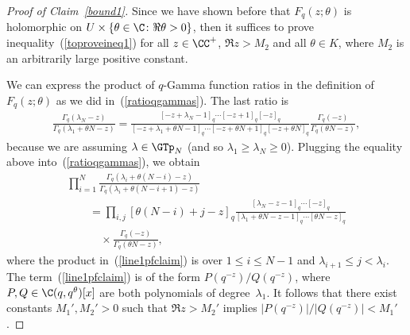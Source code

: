 \begin{proof}[Proof of Claim~\ref{bound1}]
Since we have shown before that $F_q(z; \theta)$ is holomorphic on $U\times\{\theta\in\C\colon \Re\theta > 0\}$, then it suf\/f\/ices to prove inequality~(\ref{toproveineq1}) for all $z\in\CC^+$, $\Re z > M_2$ and all $\theta\in K$, where $M_2$ is an arbitrarily large positive constant.

We can express the product of $q$-Gamma function ratios in the def\/inition of $F_q(z; \theta)$ as we did in~(\ref{ratioqgammas}). The last ratio is
\begin{gather*}
\frac{\Gamma_q(\lambda_N - z)}{\Gamma_q(\lambda_1 + \theta N - z)} = \frac{[-z + \lambda_N - 1]_q\cdots [-z+1]_q[-z]_q}{[-z + \lambda_1 + \theta N - 1]_q\cdots [-z + \theta N + 1]_q[-z + \theta N]_q}\frac{\Gamma_q(-z)}{\Gamma_q(\theta N - z)},
\end{gather*}
because we are assuming $\lambda\in\GTp_N$ (and so $\lambda_1 \geq \lambda_N \geq 0$). Plugging the equality above into~(\ref{ratioqgammas}), we obtain
\begin{gather}
\prod_{i=1}^N{\frac{\Gamma_q(\lambda_i + \theta(N - i) - z)}{\Gamma_q(\lambda_i + \theta(N - i + 1) - z) }} \nonumber\\
\qquad{} = \prod_{i, j}{ [\theta (N - i) + j - z]_q }\frac{[\lambda_N - z - 1]_q\cdots [-z]_q}{[\lambda_1 + \theta N - z - 1]_q\cdots [\theta N - z]_q}\label{line1pfclaim}\\
\qquad\quad{} \times\frac{\Gamma_q(-z)}{\Gamma_q(\theta N - z)},\label{line2pfclaim}
\end{gather}
where the product in~(\ref{line1pfclaim}) is over $1 \leq i \leq N-1$ and $\lambda_{i+1} \leq j < \lambda_i$.
The term~(\ref{line1pfclaim}) is of the form $P(q^{-z})/Q(q^{-z})$, where $P, Q\in\C(q, q^{\theta})[x]$ are both polynomials of degree~$\lambda_1$. It follows that there exist constants $M_1', M_2' > 0$ such that $\Re z > M_2'$ implies $|P(q^{-z})|/|Q(q^{-z})| < M_1'$.


\end{proof}

